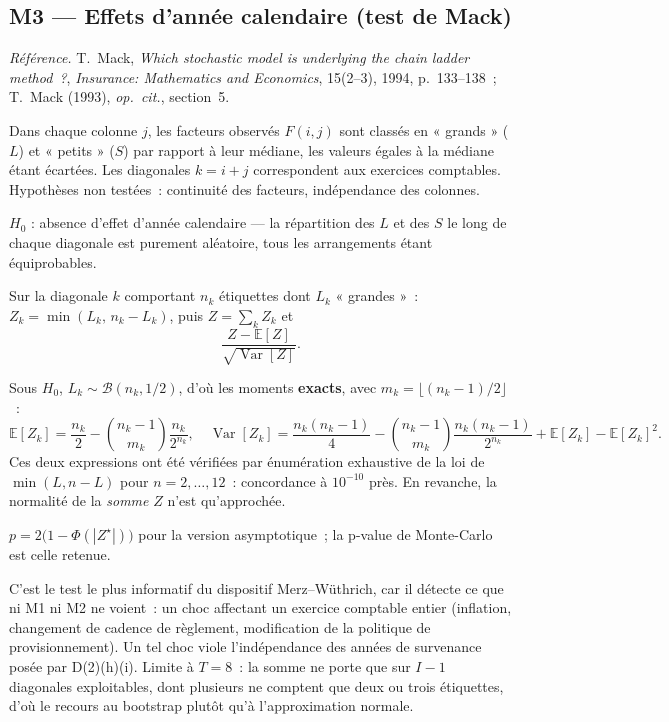 \documentclass[a4paper,11pt]{article}
\newcommand{\refl}[1]{{\small\textcolor{maincolor!70!black}{\textit{Référence.} #1}}\par\smallskip}
\newcounter{ficheid}
\newenvironment{fiche}[1]{%
  \stepcounter{ficheid}%
  \phantomsection
  \subsection{#1}%
  \label{fiche:\theficheid}%
}{%
  \end{description}\vspace{0.5em}%
}
\newcommand{\Cadre}{%
  \begin{description}[leftmargin=0pt, style=unboxed, itemsep=3pt, topsep=3pt, parsep=2pt]%
  \item[\textcolor{financeblue}{\textbf{1. Cadre, notations et hypothèses de validité (non testées).}}]}
\newcommand{\Hzero}{\item[\textcolor{financeblue}{\textbf{2. Hypothèse nulle.}}]}
\newcommand{\Stat}{\item[\textcolor{financeblue}{\textbf{3. Statistique de test.}}]}
\newcommand{\Loi}{\item[\textcolor{financeblue}{\textbf{4. Loi sous $H_0$.}}]}
\newcommand{\Pval}{\item[\textcolor{financeblue}{\textbf{5. p-value.}}]}
\newcommand{\Usage}{\item[\textcolor{financeblue}{\textbf{6. Usage et limites.}}]}
\begin{document}
\begin{fiche}{M3 --- Effets d'année calendaire (test de Mack)}
\label{mw:m3cal}
\refl{T.~Mack, \emph{Which stochastic model is underlying the chain ladder
method~?}, \emph{Insurance: Mathematics and Economics}, 15(2--3), 1994,
p.~133--138~; T.~Mack (1993), \emph{op.\ cit.}, section~5.}
\Cadre
Dans chaque colonne $j$, les facteurs observés $F(i,j)$ sont classés en
« grands » ($L$) et « petits » ($S$) par rapport à leur médiane, les valeurs
égales à la médiane étant écartées. Les diagonales $k = i+j$ correspondent aux
exercices comptables. Hypothèses non testées~: continuité des facteurs,
indépendance des colonnes.
\Hzero
$H_0$ : absence d'effet d'année calendaire --- la répartition des $L$ et des $S$
le long de chaque diagonale est purement aléatoire, tous les arrangements étant
équiprobables.
\Stat
Sur la diagonale $k$ comportant $n_k$ étiquettes dont $L_k$ « grandes »~:
$Z_k = \min(L_k,\,n_k - L_k)$, puis $Z = \sum_k Z_k$ et
\[
  \frac{Z - \mathbb{E}[Z]}{\sqrt{\operatorname{Var}[Z]}} .
\]
\Loi
Sous $H_0$, $L_k \sim \mathcal{B}(n_k, 1/2)$, d'où les moments \textbf{exacts},
avec $m_k = \lfloor (n_k-1)/2 \rfloor$~:
\[
  \mathbb{E}[Z_k] = \frac{n_k}{2} - \binom{n_k-1}{m_k}\frac{n_k}{2^{n_k}},
  \quad
  \operatorname{Var}[Z_k] = \frac{n_k(n_k-1)}{4}
  - \binom{n_k-1}{m_k}\frac{n_k(n_k-1)}{2^{n_k}} + \mathbb{E}[Z_k] - \mathbb{E}[Z_k]^2 .
\]
Ces deux expressions ont été vérifiées par énumération exhaustive de la loi de
$\min(L, n-L)$ pour $n = 2,\dots,12$~: concordance à $10^{-10}$ près. En
revanche, la normalité de la \emph{somme} $Z$ n'est qu'approchée.
\Pval
$p = 2\big(1 - \Phi(|Z^\star|)\big)$ pour la version asymptotique~; la p-value de
Monte-Carlo est celle retenue.
\Usage
C'est le test le plus informatif du dispositif Merz--Wüthrich, car il détecte ce
que ni M1 ni M2 ne voient~: un choc affectant un exercice comptable entier
(inflation, changement de cadence de règlement, modification de la politique de
provisionnement). Un tel choc viole l'indépendance des années de survenance
posée par D(2)(h)(i). Limite à $T = 8$~: la somme ne porte que sur $I-1$
diagonales exploitables, dont plusieurs ne comptent que deux ou trois
étiquettes, d'où le recours au bootstrap plutôt qu'à l'approximation normale.
\end{fiche}
\end{document}
